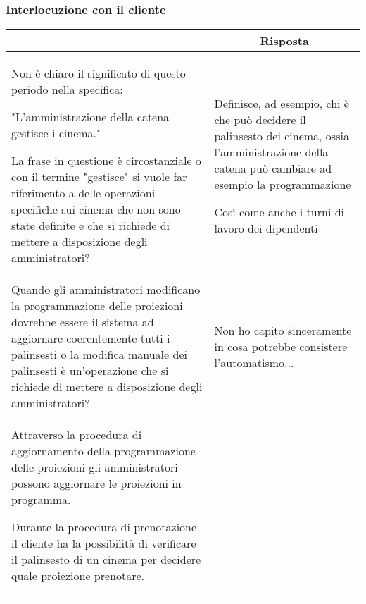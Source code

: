 \pagebreak
\subsubsection*{Interlocuzione con il cliente}

\begin{longtable}{|p{8.15cm}|p{8.15cm}|}
    \hline
    \rowcolor{tblhdrcolor}
    \multicolumn{1}{|c|}{\textbf{Messaggio}}
     & \multicolumn{1}{|c|}{\textbf{Risposta}}
    \\\hline
    Non è chiaro il significato di questo periodo nella specifica:

    "L'amministrazione della catena gestisce i cinema."

    La frase in questione è circostanziale o con il termine "gestisce" si vuole
    far riferimento a delle operazioni specifiche sui cinema che non sono state
    definite e che si richiede di mettere a disposizione degli amministratori?
     & Definisce, ad esempio, chi è che può decidere il palinsesto dei cinema,
    ossia l'amministrazione della catena può cambiare ad esempio la
    programmazione

    Così come anche i turni di lavoro dei dipendenti
    \\\hline
    Quando gli amministratori modificano la programmazione delle proiezioni
    dovrebbe essere il sistema ad aggiornare coerentemente tutti i palinsesti
    o la modifica manuale dei palinsesti è un'operazione che si richiede
    di mettere a disposizione degli amministratori?
     & Non ho capito sinceramente in cosa potrebbe consistere l'automatismo...
    \\\hline
    Attraverso la procedura di aggiornamento della programmazione delle
    proiezioni gli amministratori possono aggiornare le proiezioni in programma.

    Durante la procedura di prenotazione il cliente ha la possibilità di
    verificare il palinsesto di un cinema per decidere quale proiezione
    prenotare.


\end{longtable}
